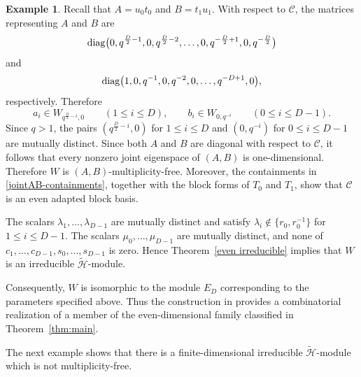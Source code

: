 \documentclass[reqno]{amsart}
\theoremstyle{definition}
\newtheorem{example}[theorem]{Example}
\begin{document}
\begin{example}
{Recall that $A=u_0t_0$ and $B=t_1u_1$.
With respect to $\mathcal{C}$, the matrices representing $A$ and $B$ are
$$
{\rm diag}
\bigl(
	0,q^{\frac{D}{2}-1},
	0,q^{\frac{D}{2}-2},
	\dots,
	0,q^{-\frac{D}{2}+1},
	0,q^{-\frac{D}{2}}
\bigr)
$$
and
$$
{\rm diag}
\bigl(
	1,0,
	q^{-1},0,
	q^{-2},0,
	\dots,
	q^{-D+1},0
\bigr),
$$
respectively.
Therefore
\begin{equation}\label{jointAB-containments}
a_i\in W_{q^{\frac{D}{2}-i},0}
\qquad (1\leq i\leq D),
\qquad
b_i\in W_{0,q^{-i}}
\qquad (0\leq i\leq D-1).
\end{equation}
Since $q>1$, the pairs
$(q^{\frac{D}{2}-i},0)$ for $1\leq i\leq D$ and
$(0,q^{-i})$ for $0\leq i\leq D-1$ are mutually distinct.
Since both $A$ and $B$ are diagonal with respect to $\mathcal{C}$,
it follows that every nonzero joint eigenspace of $(A,B)$ is
one-dimensional.
Therefore $W$ is $(A,B)$-multiplicity-free.
Moreover, the containments in \eqref{jointAB-containments}, together with the block forms
of $T_0$ and $T_1$, show that $\mathcal{C}$ is an even adapted block basis.

The scalars $\lambda_1,\dots,\lambda_{D-1}$ are mutually distinct and satisfy
$\lambda_i\notin \{r_0,r_0^{-1}\}$ for $1\leq i\leq D-1$.
The scalars $\mu_0,\dots,\mu_{D-1}$ are mutually distinct, and none of
$c_1,\dots,c_{D-1},s_0,\dots,s_{D-1}$ is zero.
Hence Theorem~\ref{even irreducible} implies that $W$ is an irreducible $\widetilde{\mathcal{H}}$-module.

Consequently, $W$ is isomorphic to the module $E_D$ corresponding to
the parameters specified above.
Thus the construction in \cite{LeeTanaka} provides a combinatorial
realization of a member of the even-dimensional family classified in
Theorem~\ref{thm:main}.
}
%
\end{example}


The next example shows that there is a
finite-dimensional irreducible $\widetilde{\mathcal{H}}$-module
which is not multiplicity-free.
\end{document}
